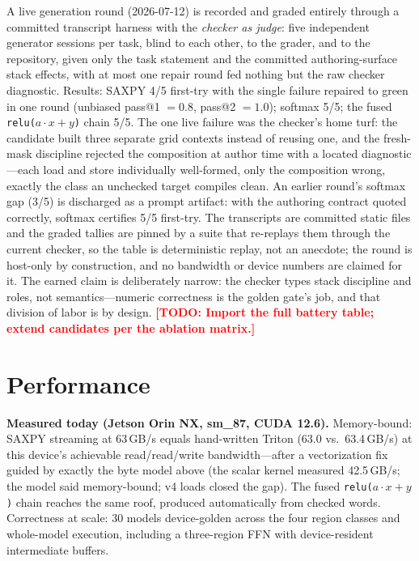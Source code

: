 \documentclass[11pt]{article}
\newcommand{\todo}[1]{\textcolor{red}{\textbf{[TODO: #1]}}}
\newcommand{\code}[1]{\texttt{#1}}
\begin{document}
A live generation round (2026-07-12) is recorded and graded entirely
through a committed transcript harness with the \emph{checker as judge}:
five independent generator sessions per task, blind to each other, to the
grader, and to the repository, given only the task statement and the
committed authoring-surface stack effects, with at most one repair round
fed nothing but the raw checker diagnostic. Results: SAXPY 4/5 first-try
with the single failure repaired to green in one round (unbiased pass@1
$=0.8$, pass@2 $=1.0$); softmax 5/5; the fused
\code{relu($a{\cdot}x{+}y$)} chain 5/5. The one live failure was the
checker's home turf: the candidate built three separate grid contexts
instead of reusing one, and the fresh-mask discipline rejected the
composition at author time with a located diagnostic---each load and
store individually well-formed, only the composition wrong, exactly the
class an unchecked target compiles clean. An earlier round's softmax gap
(3/5) is discharged as a prompt artifact: with the authoring contract
quoted correctly, softmax certifies 5/5 first-try. The transcripts are
committed static files and the graded tallies are pinned by a suite that
re-replays them through the current checker, so the table is
deterministic replay, not an anecdote; the round is host-only by
construction, and no bandwidth or device numbers are claimed for it.
The earned
claim is deliberately narrow: the checker types stack discipline and
roles, not semantics---numeric correctness is the golden gate's job, and
that division of labor is by design.
\todo{Import the full battery table; extend candidates per the ablation
matrix.}

\section{Performance}\label{sec:perf}\label{sec:results}
\textbf{Measured today (Jetson Orin NX, sm\_87, CUDA 12.6).}
Memory-bound: SAXPY streaming at 63\,GB/s equals hand-written Triton
(63.0 vs.\ 63.4\,GB/s) at this device's achievable read/read/write
bandwidth---after a vectorization fix guided by exactly the byte model
above (the scalar kernel measured 42.5\,GB/s; the model said
memory-bound; v4 loads closed the gap). The fused
\code{relu($a{\cdot}x{+}y$)} chain reaches the same roof, produced
automatically from checked words. Correctness at scale: 30 models
device-golden across the four region classes and whole-model execution,
including a three-region FFN with device-resident intermediate buffers.
\end{document}

